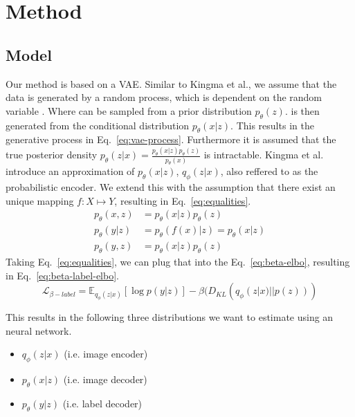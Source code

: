 \chapter{Method}\label{chapter:first_real_chapter}

\section{Model}
Our method is based on a VAE\cite{kingma2014autoencodingvariationalbayes}. 
Similar to Kingma et al., we assume that the data is generated by a random process, which is dependent on the random variable . Where  can be sampled from a prior distribution $p_\theta(z)$.  is then generated from the conditional distribution $p_\theta(x|z)$. This results in the generative process in Eq.~\ref{eq:vae-process}. Furthermore it is assumed that the true posterior density $p_\theta(z|x) = \frac{p_\theta(x|z)p_\theta(z)}{p_\theta(x)}$ is intractable.  Kingma et al. introduce an approximation of $p_\theta(x|z)$, $q_\phi(z|x)$, also reffered to as the probabilistic encoder.
We extend this with the assumption that there exist an unique mapping $f: X \mapsto Y$, resulting in Eq.~\ref{eq:equalities}. 
\begin{subequations}
    \begin{align}
        p_\theta(x, z) & = p_\theta(x|z)p_\theta(z) \label{eq:vae-process}        \\
        p_\theta(y|z)  & = p_\theta(f(x)|z) = p_\theta(x|z) \label{eq:equalities} \\
        p_\theta(y, z) & = p_\theta(x|z)p_\theta(z)\label{eq:label-process}
    \end{align}
\end{subequations}
Taking Eq.~\ref{eq:equalities}, we can plug that into the Eq.~\ref{eq:beta-elbo}, resulting in Eq.~\ref{eq:beta-label-elbo}.
\begin{equation}
    \label{eq:beta-label-elbo}
    \mathcal{L}_{\beta-label} = \mathbb{E}_{q_{\phi}(z|x)}[\log p(y|z)] - \beta (D_{KL}(q_{\phi}(z|x) || p(z)))
\end{equation}


This results in the following three distributions we want to estimate using an neural network.
\begin{itemize}
    \item $q_\phi(z|x)$ (i.e. image encoder)
    \item $p_\theta(x|z)$ (i.e. image decoder)
    \item $p_\theta(y|z)$ (i.e. label decoder)
\end{itemize}

